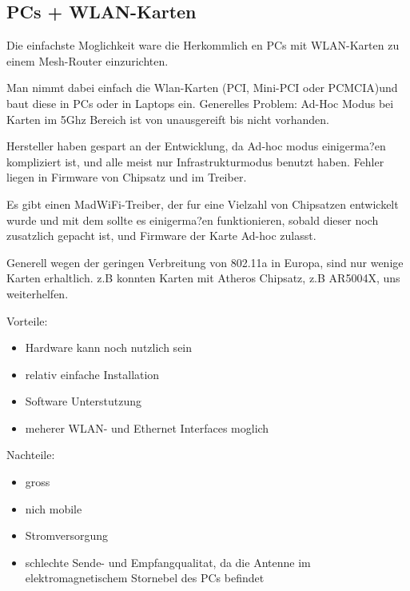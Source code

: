 \subsection{PCs + WLAN-Karten}

Die einfachste Moglichkeit ware die Herkommlich en PCs mit WLAN-Karten
zu einem Mesh-Router einzurichten.

Man nimmt dabei einfach die Wlan-Karten (PCI, Mini-PCI oder PCMCIA)und
baut diese in PCs oder in Laptops ein.  Generelles Problem:
 Ad-Hoc Modus bei Karten im 5Ghz Bereich ist von unausgereift bis nicht
 vorhanden.

Hersteller haben gespart an der Entwicklung, da Ad-hoc modus
einigerma?en kompliziert ist, und alle meist nur Infrastrukturmodus
benutzt haben. Fehler liegen in Firmware von Chipsatz und im Treiber.

Es gibt einen MadWiFi-Treiber, der fur eine Vielzahl von Chipsatzen
entwickelt wurde und mit dem sollte es einigerma?en funktionieren, sobald
dieser noch zusatzlich gepacht ist, und Firmware der Karte Ad-hoc zulasst.

Generell wegen der geringen Verbreitung von 802.11a in Europa, sind
nur wenige Karten erhaltlich. z.B konnten Karten mit Atheros Chipsatz,
z.B AR5004X, uns weiterhelfen.

Vorteile:
\begin{itemize} 
\item Hardware kann noch nutzlich sein 
\item relativ einfache Installation 
\item Software Unterstutzung 
\item meherer WLAN- und Ethernet Interfaces moglich 
\end{itemize}

Nachteile: 
\begin{itemize}
\item gross 
\item nich mobile 
\item Stromversorgung 
\item schlechte Sende- und Empfangqualitat, da die Antenne im
elektromagnetischem Stornebel des PCs befindet
\end{itemize}




